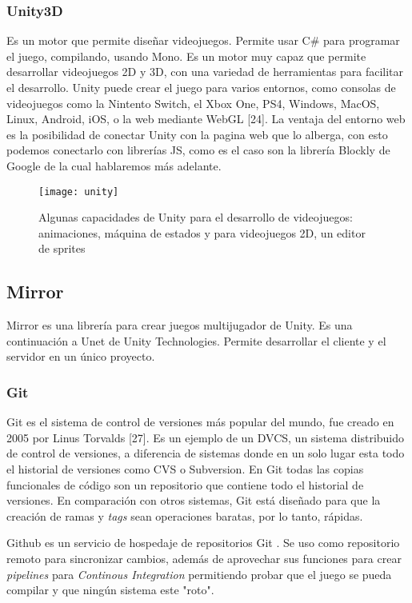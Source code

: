 \subsubsection{Unity3D}
Es un motor que permite diseñar videojuegos. Permite usar C\# para programar el juego, compilando, usando Mono\cite{unity2019}. Es un motor muy capaz que permite desarrollar videojuegos 2D y 3D, con una variedad de herramientas para facilitar el desarrollo.
Unity puede crear el juego para varios entornos, como consolas de videojuegos como la Nintento Switch, el Xbox One, PS4, Windows, MacOS, Linux, Android, iOS, o la web mediante WebGL [24]. La ventaja del entorno web es la posibilidad de conectar Unity con la pagina web que lo alberga, con esto podemos conectarlo con librerías JS, como es el caso son la librería Blockly de Google de la cual hablaremos más adelante.
\begin{figure}[h]
    \centering
    \texttt{[image: unity]}
        \caption{Algunas capacidades de Unity para el desarrollo de videojuegos: animaciones, máquina de estados y para videojuegos 2D, un editor de sprites}
\end{figure}

\subsection{Mirror}
Mirror es una librería para crear juegos multijugador de Unity. Es una continuación a Unet de Unity Technologies. Permite desarrollar el cliente y el servidor en un único proyecto.

\subsubsection{Git}
Git es el sistema de control de versiones más popular del mundo, fue creado en 2005 por Linus Torvalds [27]. Es un ejemplo de un DVCS, un sistema distribuido de control de versiones, a diferencia de sistemas donde en un solo lugar esta todo el historial de versiones como CVS o Subversion. En Git todas las copias funcionales de código son un repositorio que contiene todo el historial de versiones.
En comparación con otros sistemas, Git está diseñado para que la creación de ramas y \textit{tags} sean operaciones baratas, por lo tanto, rápidas.

Github es un servicio de hospedaje de repositorios Git \cite{finley2012a}. Se uso como repositorio remoto para sincronizar cambios, además de aprovechar sus funciones para crear \textit{pipelines} para \textit{Continous Integration} permitiendo probar que el juego se pueda compilar y que ningún sistema este "roto".